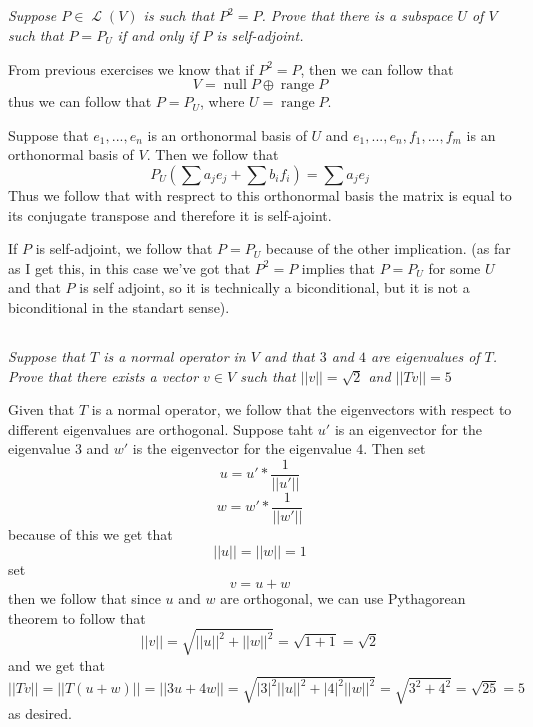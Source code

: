 \documentclass[11pt,oneside,titlepage]{book}
\DeclareMathOperator \map {\mathcal {L}}
\DeclareMathOperator \ns {null}
\DeclareMathOperator \range {range}
\begin{document}
\subsection{}

\textit{Suppose $P \in \map(V)$ is such that $P^2 = P$. Prove that there is a subspace $U$ of
$V$ such that $P = P_U$ if and only if $P$ is self-adjoint.}

From previous exercises we know that if $P^2 = P$, then we can follow that
$$V = \ns P \oplus \range P$$
thus we can follow that $P = P_U$, where $U = \range P$.

Suppose that $e_1, ..., e_n$ is an orthonormal basis of $U$ and $e_1, ..., e_n, f_1, ..., f_m$ is an
orthonormal basis of $V$.
Then we follow that
$$P_U (\sum {a_j e_j} + \sum{b_i f_i}) = \sum a_j e_j$$
Thus we follow that with resprect to this orthonormal basis the matrix is equal to its conjugate
transpose and therefore it is self-ajoint.

If $P$ is self-adjoint, we follow that $P = P_U$ because of the other implication.
(as far as I get this, in this case we've got that $P^2 = P$ implies that $P = P_U$ for some
$U$ and that $P$ is self adjoint, so it is technically a biconditional, but it is not
a biconditional in the standart sense).

\subsection{}

\textit{Suppose that $T$ is a normal operator in $V$ and that $3$ and $4$ are eigenvalues of
  $T$. Prove that there exists a vector $v \in V$ such that $||v|| = \sqrt{2}$ and $||Tv|| = 5$}

Given that $T$ is a normal operator, we follow that the eigenvectors with respect to different
eigenvalues are orthogonal. Suppose taht $u'$ is an eigenvector for the eigenvalue $3$ and
$w'$ is the eigenvector for the eigenvalue $4$. Then set
$$u = u' * \frac{1}{||u'||}$$
$$w = w' * \frac{1}{||w'||}$$
because of this we get that
$$||u|| = ||w|| = 1$$
set
$$v = u + w$$
then we follow  that since $u$ and $w$ are orthogonal, we can use Pythagorean theorem
to follow that
$$||v|| = \sqrt{||u||^2 + ||w||^2 } = \sqrt{1 + 1} = \sqrt{2}$$
and we get that
$$||Tv|| = ||T(u + w)|| = ||3u + 4w|| = \sqrt{|3|^2 ||u||^2 + |4|^2 ||w||^2} = \sqrt{3^2 + 4^2} =
\sqrt{25} = 5$$
as desired.


\subsection{}
\end{document}
